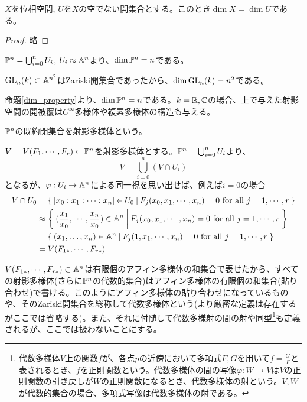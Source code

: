 \documentclass{ltjsreport}
\begin{document}
\begin{prop}\label{dim_property}
  $X$を位相空間, $U$を$X$の空でない開集合とする。このとき$\dim X=\dim U$である。
\end{prop}

\begin{proof}
  略
\end{proof}

\begin{eg}
  $\mathbb{P}^n=\bigcup_{i=0}^nU_i$, $U_i\approx \mathbb{A}^n$より、$\dim\mathbb{P}^n=n$である。
\end{eg}

\begin{eg}
  $\text{GL}_n(k)\subset\mathbb{A}^{n^2}$はZariski開集合であったから、$\dim\text{GL}_n(k)=n^2$である。
\end{eg}

命題\ref{dim_property}より、$\dim \mathbb{P}^n=n$である。$k=\mathbb{R},\mathbb{C}$の場合、上で与えた射影空間の開被覆は$C^\infty$多様体や複素多様体の構造も与える。

\begin{defin}
  $\mathbb{P}^n$の既約閉集合を射影多様体という。
\end{defin}

$V=V(F_1,\cdots,F_r)\subset\mathbb{P}^n$を射影多様体とする。$\mathbb{P}^n=\bigcup_{i=0}^nU_i$より、
\[
V=\bigcup_{i=0}^n(V\cap U_i)
\]
となるが、$\varphi:U_i\rightarrow \mathbb{A}^n$による同一視を思い出せば、例えば$i=0$の場合
\begin{align*}
V\cap U_0
&=\left\{\:[x_0:x_1:\cdots:x_n]\in U_0\:\middle|\:F_j(x_0,x_1,\cdots,x_n)=0\text{ for all $j=1,\cdots,r$}\:\right\}\\
&\approx \left\{\:(\frac{x_1}{x_0},\cdots,\frac{x_n}{x_0})\in\mathbb{A}^n\:\middle|\:F_j(x_0,x_1,\cdots,x_n)=0\text{ for all $j=1,\cdots,r$}\:\right\}\\
&=\left\{\:(x_1,\dots,x_n)\in\mathbb{A}^n\:\middle|\:F_j(1,x_1,\cdots,x_n)=0\text{ for all $j=1,\cdots,r$}\:\right\}\\
&=V(F_{1*},\cdots,F_{r*})
\end{align*}

$V(F_{1*},\cdots,F_{r*})\subset\mathbb{A}^n$は有限個のアフィン多様体の和集合で表せたから、すべての射影多様体(さらに$\mathbb{P}^n$の代数的集合)はアフィン多様体の有限個の和集合(貼り合わせ)で書ける。このようにアフィン多様体の貼り合わせになっているものや、そのZariski開集合を総称して代数多様体という(より厳密な定義は存在するがここでは省略する)。また、それに付随して代数多様射の間の射や同型\footnote{
  代数多様体$V$上の関数$f$が、各点$p$の近傍において多項式$F,G$を用いて$f=\frac{G}{F}$と表されるとき、$f$を正則関数という。代数多様体の間の写像$\varphi:W\rightarrow V$は$V$の正則関数の引き戻しが$W$の正則関数になるとき、代数多様体の射という。$V,W$が代数的集合の場合、多項式写像は代数多様体の射である。
}も定義されるが、ここでは扱わないことにする。
\end{document}
